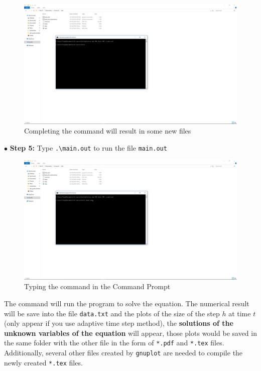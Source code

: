 \documentclass{article}
\begin{document}
	\begin{figure}[H]
		\centering	\includegraphics[width=15cm]{fig6}
		\caption{Completing the command will result in some new files}
	\end{figure}
	\noindent$\bullet$ \textbf{Step 5:} Type \texttt{.\textbackslash main.out} to run the file \texttt{main.out}
	\begin{figure}[H]
		\centering	\includegraphics[width=15cm]{fig7}
		\caption{Typing the command in the Command Prompt}
	\end{figure}
	\noindent The command will run the program to solve the equation. The numerical result will be save into the file \texttt{data.txt} and the plots of the size of the step $h$ at time $t$ (only appear if you use adaptive time step method), the \textbf{solutions of the unknown variables of the equation} will appear, those plots would be saved in the same folder with the other file in the form of \texttt{*.pdf} and \texttt{*.tex} files. Additionally, several other files created by \texttt{gnuplot} are needed to compile the newly created \texttt{*.tex} files. 
\end{document}
